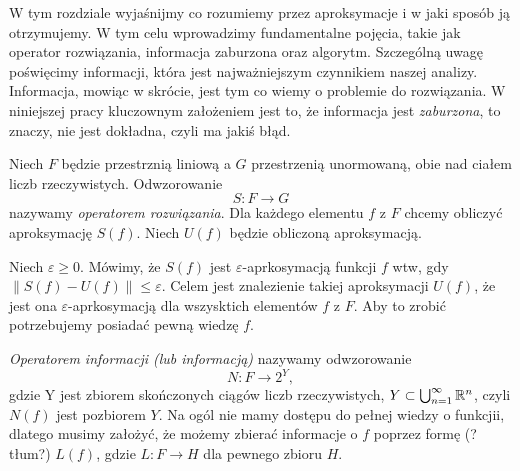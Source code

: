 \documentclass[oik, pdftex, robocza, man]{mgrwms}
\begin{document}
    W tym rozdziale wyjaśnijmy co rozumiemy przez aproksymacje i w jaki sposób ją otrzymujemy. W tym celu wprowadzimy fundamentalne pojęcia, takie jak operator rozwiązania, informacja zaburzona oraz algorytm. Szczególną uwagę poświęcimy informacji, która jest najważniejszym czynnikiem naszej analizy. Informacja, mowiąc w skrócie, jest tym co wiemy o problemie do rozwiązania. W niniejszej pracy kluczownym założeniem jest to, że informacja jest \textit{zaburzona}, to znaczy, nie jest dokładna, czyli ma jakiś błąd.

    Niech $F$ będzie przestrznią liniową a $G$ przestrzenią unormowaną, obie nad ciałem liczb rzeczywistych. Odwzorowanie 
    \begin{equation*}
        S : F \rightarrow G
    \end{equation*}
    nazywamy \textit{operatorem rozwiązania}. Dla każdego elementu $f$ z $F$ chcemy obliczyć aproksymację $S(f)$. Niech $U(f)$ będzie obliczoną aproksymacją.

    Niech $\varepsilon \geq 0$. Mówimy, że $S(f)$ jest $\varepsilon$-aprkosymacją funkcji $f$ wtw, gdy $\| S(f) -  U(f)\| \leq \varepsilon$. Celem jest znalezienie takiej aproksymacji $U(f)$, że jest ona $\varepsilon$-aprkosymacją dla wszysktich elementów $f$ z $F$. Aby to zrobić potrzebujemy posiadać pewną wiedzę $f$.

    \textit{Operatorem informacji (lub informacją)} nazywamy odwzorowanie
    \begin{equation*}
        N : F \rightarrow 2^{Y},
    \end{equation*}
    gdzie Y jest zbiorem skończonych ciągów liczb rzeczywistych, $ Y \subset \bigcup^{\infty}_{n=1} \mathbb{R}^{n}$, czyli $N(f)$ jest pozbiorem $Y$.
    Na ogól nie mamy dostępu do pełnej wiedzy o funkcjii, dlatego musimy założyć, że możemy zbierać informacje o $f$ poprzez formę (?tłum?) $L(f)$, gdzie $L : F \rightarrow H$ dla pewnego zbioru $H$.
    
\end{document}
